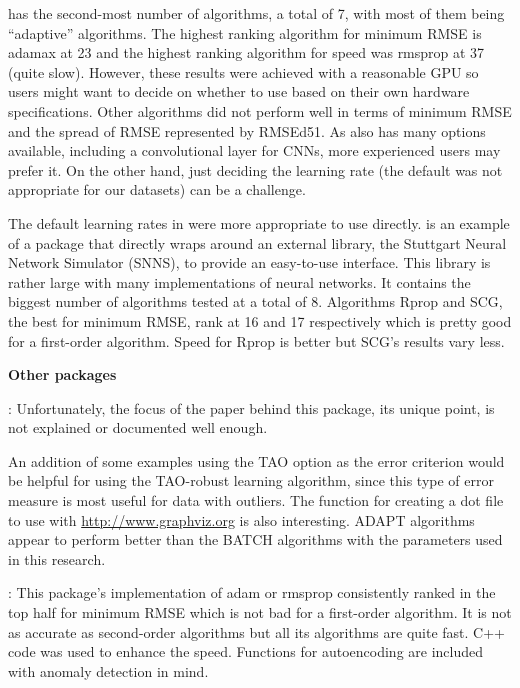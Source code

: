  has the second-most number of algorithms, a total of 7,
with most of them being ``adaptive'' algorithms. The highest ranking
algorithm for minimum RMSE is adamax at 23 and the highest ranking
algorithm for speed was rmsprop at 37 (quite slow). However, these
results were achieved with a reasonable GPU so users might want to
decide on whether to use  based on their own hardware
specifications. Other algorithms did not perform well in terms of
minimum RMSE and the spread of RMSE represented by RMSEd51. As
 also has many options available, including a
convolutional layer for CNNs, more experienced users may prefer it. On
the other hand, just deciding the learning rate (the default was not
appropriate for our datasets) can be a challenge.

The default learning rates in  \citep{R-RSNNS} were more
appropriate to use directly.  is an example of a package
that directly wraps around an external library, the Stuttgart Neural
Network Simulator (SNNS), to provide an easy-to-use interface. This
library is rather large with many implementations of neural networks. It
contains the biggest number of algorithms tested at a total of 8.
Algorithms Rprop and SCG, the best for minimum RMSE, rank at 16 and 17
respectively which is pretty good for a first-order algorithm. Speed for
Rprop is better but SCG's results vary less.

\textbf{Other packages }

 \citep{R-AMORE}: Unfortunately, the focus of the paper
behind this package, its unique point, is not explained or documented
well enough.

An addition of some examples using the TAO option as the error criterion
would be helpful for using the TAO-robust learning algorithm, since this
type of error measure is most useful for data with outliers. The
function for creating a dot file to use with
\url{http://www.graphviz.org} is also interesting. ADAPT algorithms
appear to perform better than the BATCH algorithms with the parameters
used in this research.

 \citep{R-ANN2}: This package's implementation of adam or
rmsprop consistently ranked in the top half for minimum RMSE which is
not bad for a first-order algorithm. It is not as accurate as
second-order algorithms but all its algorithms are quite fast.
\textsf{C++} code was used to enhance the speed. Functions for
autoencoding are included with anomaly detection in mind.

